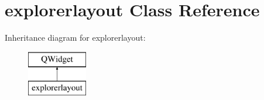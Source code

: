 \hypertarget{classexplorerlayout}{\section{explorerlayout Class Reference}
\label{classexplorerlayout}
}
Inheritance diagram for explorerlayout\-:\begin{figure}[H]
\begin{center}
\leavevmode
\includegraphics[height=2.000000cm]{classexplorerlayout}
\end{center}
\end{figure}
